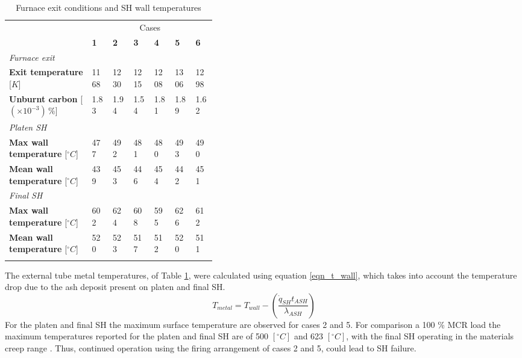 \documentclass[review]{elsarticle}
\begin{document}
\begin{table}[h!]
\centering
\caption{Furnace exit conditions and SH wall temperatures}
\vspace{2mm}
{\tabulinesep=1.2mm
\begin{tabularx}{\linewidth}{p{0.4\linewidth} XXXXXX}
\hline
&\multicolumn{6}{c}{Cases}\\
 & \textbf{1} & \textbf{2} & \textbf{3}& \textbf{4}&\textbf{5}&\textbf{6}\\
\hline
\multicolumn{7}{l}{\textit{Furnace exit}}\\
\textbf{Exit temperature} [$K$] & 1168 & 1230 & 1215 & 1208 & 1306 & 1298\\
\textbf{Unburnt carbon} [$(\times 10^{-3})\,\%$] & 1.83 & 1.94 & 1.54 & 1.81 & 1.89 & 1.62\\
\multicolumn{7}{l}{\textit{Platen SH}}\\
\textbf{Max wall temperature} [$^{\circ}C$]  &477 & 492 & 481  & 480 & 493 & 490\\
\textbf{Mean wall temperature} [$^{\circ}C$] &439 & 453 & 446 & 454 & 442 & 451\\
\multicolumn{7}{l}{\textit{Final SH}}\\
\textbf{Max wall temperature} [$^{\circ}C$]  & 602 & 624 & 608 & 595 & 626 & 612\\
\textbf{Mean wall temperature} [$^{\circ}C$] & 520 & 523 & 517 & 512 & 520 & 511\\
\hline
\label{tbl_cfd_results}
\end{tabularx}}
\end{table}
The external tube metal temperatures, of Table \ref{tbl_cfd_results}, were calculated using equation \ref{eqn_t_wall}, which takes into account the temperature drop due to the ash deposit present on platen and final SH.
\begin{equation}\label{eqn_t_wall}
T_{metal} = T_{wall} - \left(\frac{\dot{q}_{SH}t_{ASH}}{\lambda_{ASH}}\right)
\end{equation}
For the platen and final SH the maximum surface temperature are observed for cases 2 and 5. For comparison a 100 \% MCR load the maximum temperatures reported for the platen and final SH are of 500 $[^\circ C]$ and 623 $[^\circ C]$, with the final SH operating in the materials creep range \cite{Laubscher2019b}. Thus, continued operation using the firing arrangement of cases 2 and 5, could lead to SH failure.
\end{document}
